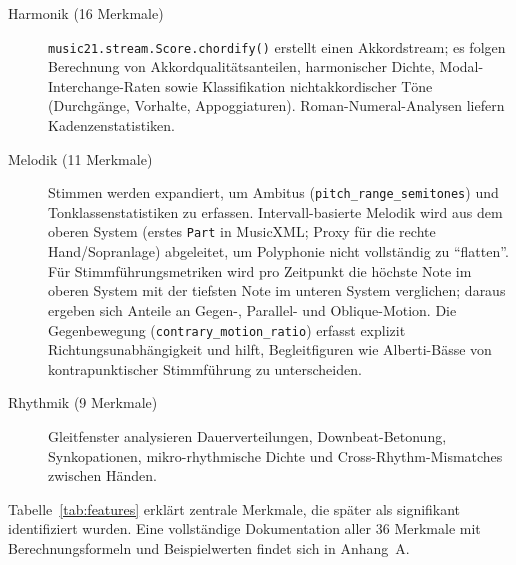 \documentclass[12pt,a4paper]{article}
\theoremstyle{definition}
\begin{document}
\begin{description}
    \item[Harmonik (16 Merkmale)] \texttt{music21.stream.Score.chordify()} erstellt einen Akkordstream; es folgen Berechnung von Akkordqualitätsanteilen, harmonischer Dichte, Modal-Interchange-Raten sowie Klassifikation nichtakkordischer Töne (Durchgänge, Vorhalte, Appoggiaturen). Roman-Numeral-Analysen liefern Kadenzenstatistiken.
    \item[Melodik (11 Merkmale)] Stimmen werden expandiert, um Ambitus (\texttt{pitch\_range\_semitones}) und Tonklassenstatistiken zu erfassen. Intervall-basierte Melodik wird aus dem oberen System (erstes \texttt{Part} in MusicXML; Proxy für die rechte Hand/Sopranlage) abgeleitet, um Polyphonie nicht vollständig zu \enquote{flatten}. Für Stimmführungsmetriken wird pro Zeitpunkt die höchste Note im oberen System mit der tiefsten Note im unteren System verglichen; daraus ergeben sich Anteile an Gegen-, Parallel- und Oblique-Motion. Die Gegenbewegung (\texttt{contrary\_motion\_ratio}) erfasst explizit Richtungsunabhängigkeit und hilft, Begleitfiguren wie Alberti-Bässe von kontrapunktischer Stimmführung zu unterscheiden.
    \item[Rhythmik (9 Merkmale)] Gleitfenster analysieren Dauerverteilungen, Downbeat-Betonung, Synkopationen, mikro-rhythmische Dichte und Cross-Rhythm-Mismatches zwischen Händen.
\end{description}

Tabelle~\ref{tab:features} erklärt zentrale Merkmale, die später als signifikant identifiziert wurden. Eine vollständige Dokumentation aller 36 Merkmale mit Berechnungsformeln und Beispielwerten findet sich in Anhang~A.
\end{document}
